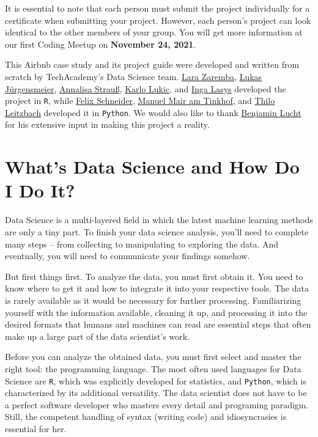 \documentclass[
  11pt,
]{article}
\begin{document}
It is essential to note that each person must submit the project individually for a certificate when submitting your project.
However, each person's project can look identical to the other members of your group.
You will get more information at our first Coding Meetup on \textbf{November 24, 2021}.

This Airbnb case study and its project guide were developed and written from scratch by TechAcademy's Data Science team.
\href{https://linkedin.com/in/lara-zaremba}{Lara Zaremba}, \href{https://linkedin.com/in/lukas-juergensmeier}{Lukas Jürgensmeier}, \href{https://linkedin.com/in/annalisastrauss}{Annalisa Strauß}, \href{https://linkedin.com/in/karlo-lukic}{Karlo Lukic}, and \href{https://linkedin.com/in/inga-l-544713180}{Inga Lasys} developed the project in \texttt{R}, while \href{https://linkedin.com/in/flxschneider}{Felix Schneider}, \href{https://linkedin.com/in/manuel-mair-am-tinkhof-7b764111b}{Manuel Mair am Tinkhof}, and \href{https://linkedin.com/in/thilo-leitzbach}{Thilo Leitzbach} developed it in \texttt{Python}.
We would also like to thank \href{https://linkedin.com/in/benjamin-lucht}{Benjamin Lucht} for his extensive input in making this project a reality.

\hypertarget{whats-data-science-and-how-do-i-do-it}{%
\section{What's Data Science and How Do I Do It?}\label{whats-data-science-and-how-do-i-do-it}}

Data Science is a multi-layered field in which the latest machine learning methods are only a tiny part.
To finish your data science analysis, you'll need to complete many steps -- from collecting to manipulating to exploring the data.
And eventually, you will need to communicate your findings somehow.

But first things first.
To analyze the data, you must first obtain it.
You need to know where to get it and how to integrate it into your respective tools.
The data is rarely available as it would be necessary for further processing.
Familiarizing yourself with the information available, cleaning it up, and processing it into the desired formats that humans and machines can read are essential steps that often make up a large part of the data scientist's work.

Before you can analyze the obtained data, you must first select and master the right tool: the programming language.
The most often used languages for Data Science are \texttt{R}, which was explicitly developed for statistics, and \texttt{Python}, which is characterized by its additional versatility.
The data scientist does not have to be a perfect software developer who masters every detail and programing paradigm.
Still, the competent handling of syntax (writing code) and idiosyncrasies is essential for her.
\end{document}
